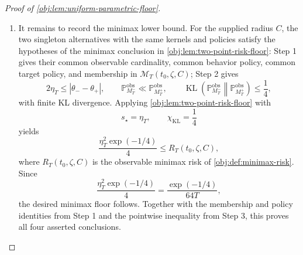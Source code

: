 \begin{proof}[Proof of \cref{obj:lem:uniform-parametric-floor}]
\begin{enumerate}
\item It remains to record the minimax lower bound.  For the supplied radius \(C\),
the two singleton alternatives with the same kernels and policies satisfy the
hypotheses of the minimax conclusion in \cref{obj:lem:two-point-risk-floor}:
Step 1 gives their common observable cardinality, common behavior policy,
common target policy, and membership in \(\mathcal M_T(t_0,\zeta,C)\); Step 2
gives
\[
2\eta_T
\le
|\theta_- - \theta_+|,
\qquad
\mathbb P_{M_T^-}^{\mathrm{obs}}\ll
\mathbb P_{M_T^+}^{\mathrm{obs}},
\qquad
\operatorname{KL}\!\left(
\mathbb P_{M_T^-}^{\mathrm{obs}}
\middle\|
\mathbb P_{M_T^+}^{\mathrm{obs}}
\right)
\le
\frac14,
\]
with finite KL divergence.  Applying \cref{obj:lem:two-point-risk-floor} with
\[
s_\star=\eta_T,
\qquad
\chi_{\mathrm{KL}}=\frac14
\]
yields
\[
\frac{\eta_T^2\exp(-1/4)}{4}
\le
R_T(t_0,\zeta,C),
\]
where \(R_T(t_0,\zeta,C)\) is the observable minimax risk of
\cref{obj:def:minimax-risk}.  Since
\[
\frac{\eta_T^2\exp(-1/4)}{4}
=
\frac{\exp(-1/4)}{64T},
\]
the desired minimax floor follows.  Together with the membership and policy
identities from Step 1 and the pointwise inequality from Step 3, this proves
all four asserted conclusions.
\end{enumerate}
\end{proof}
